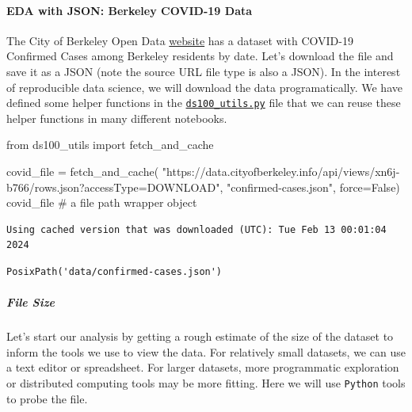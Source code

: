 \documentclass[
  letterpaper,
  DIV=11,
  numbers=noendperiod]{scrreprt}
\let\oldparagraph\paragraph
\renewcommand{\paragraph}[1]{\oldparagraph{#1}\mbox{}}
\let\oldsubparagraph\subparagraph
\renewcommand{\subparagraph}[1]{\oldsubparagraph{#1}\mbox{}}
\newenvironment{Shaded}{\begin{snugshade}}{\end{snugshade}}
\newcommand{\CommentTok}[1]{\textcolor[rgb]{0.37,0.37,0.37}{#1}}
\newcommand{\ImportTok}[1]{\textcolor[rgb]{0.00,0.46,0.62}{#1}}
\newcommand{\NormalTok}[1]{\textcolor[rgb]{0.00,0.23,0.31}{#1}}
\newcommand{\OperatorTok}[1]{\textcolor[rgb]{0.37,0.37,0.37}{#1}}
\newcommand{\StringTok}[1]{\textcolor[rgb]{0.13,0.47,0.30}{#1}}
\newcommand{\VariableTok}[1]{\textcolor[rgb]{0.07,0.07,0.07}{#1}}
\begin{document}
\paragraph{EDA with JSON: Berkeley COVID-19
Data}\label{eda-with-json-berkeley-covid-19-data}

The City of Berkeley Open Data
\href{https://data.cityofberkeley.info/Health/COVID-19-Confirmed-Cases/xn6j-b766}{website}
has a dataset with COVID-19 Confirmed Cases among Berkeley residents by
date. Let's download the file and save it as a JSON (note the source URL
file type is also a JSON). In the interest of reproducible data science,
we will download the data programatically. We have defined some helper
functions in the
\href{https://ds100.org/fa23/resources/assets/lectures/lec05/lec05-eda.html}{\texttt{ds100\_utils.py}}
file that we can reuse these helper functions in many different
notebooks.

\begin{Shaded}
\begin{Highlighting}[]
\ImportTok{from}\NormalTok{ ds100\_utils }\ImportTok{import}\NormalTok{ fetch\_and\_cache}

\NormalTok{covid\_file }\OperatorTok{=}\NormalTok{ fetch\_and\_cache(}
    \StringTok{"https://data.cityofberkeley.info/api/views/xn6j{-}b766/rows.json?accessType=DOWNLOAD"}\NormalTok{,}
    \StringTok{"confirmed{-}cases.json"}\NormalTok{,}
\NormalTok{    force}\OperatorTok{=}\VariableTok{False}\NormalTok{)}
\NormalTok{covid\_file          }\CommentTok{\# a file path wrapper object}
\end{Highlighting}
\end{Shaded}

\begin{verbatim}
Using cached version that was downloaded (UTC): Tue Feb 13 00:01:04 2024
\end{verbatim}

\begin{verbatim}
PosixPath('data/confirmed-cases.json')
\end{verbatim}

\subparagraph{File Size}\label{file-size}

Let's start our analysis by getting a rough estimate of the size of the
dataset to inform the tools we use to view the data. For relatively
small datasets, we can use a text editor or spreadsheet. For larger
datasets, more programmatic exploration or distributed computing tools
may be more fitting. Here we will use \texttt{Python} tools to probe the
file.
\end{document}
